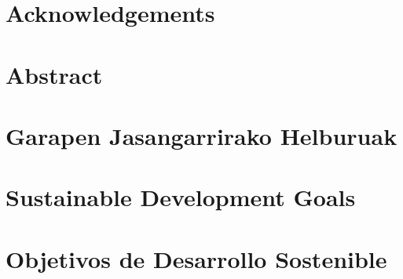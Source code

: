 \documentclass[a4paper, 11pt, showtrims]{memoir}
\title{\izenburua}
\author{\egilea}
\date{\data}
\newcommand{\english}{}
\begin{document}
 
	
%
 
 
 
%

%
%
 
\cleardoublepage
\frontmatter
{}
\pagestyle{plain}
\setcounter{page}{1}
 
 
\chapter*{Acknowledgements}

\cleardoublepage
 
 
\chapter*{Abstract}

\cleardoublepage
 
\ifdefined\euskaraz
\chapter*{Garapen Jasangarrirako Helburuak} \label{ch:GJH}

\else\ifdefined\english
\chapter*{Sustainable Development Goals} \label{ch:SDG}

\else
\chapter*{Objetivos de Desarrollo Sostenible} \label{ch:ODS}

\fi\fi
 
\end{document}
